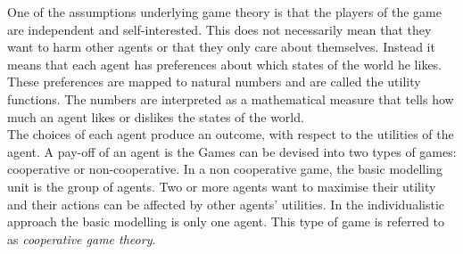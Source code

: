 One of the assumptions underlying game theory is that the players of the game are independent and self-interested. This does not necessarily mean that they want to harm other agents or that they only care about themselves. 
Instead it means that each agent has preferences about which states of the world he likes. These preferences are mapped to natural numbers and are called the utility functions. The numbers are interpreted as a mathematical measure that tells how much an agent likes or dislikes the states of the world. \\
%
The choices of each agent produce an outcome, with respect to the utilities of the agent. A pay-off of an agent is the 
Games can be devised into two types of games: cooperative or non-cooperative. In a non cooperative game, the basic modelling unit is the group of agents. 
Two or more agents want to maximise their utility and their actions can be affected by other agents' utilities. In the individualistic approach the basic modelling is only one agent. This type of game is referred to as \textit{cooperative game theory}. 

 


